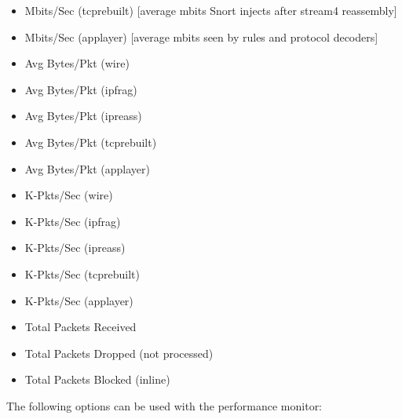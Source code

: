 \documentclass[english]{report}
\begin{document}
\begin{itemize}
\item Mbits/Sec (tcprebuilt) [average mbits Snort injects after stream4 reassembly]
\item Mbits/Sec (applayer) [average mbits seen by rules and protocol decoders]
\item Avg Bytes/Pkt (wire)
\item Avg Bytes/Pkt (ipfrag)
\item Avg Bytes/Pkt (ipreass)
\item Avg Bytes/Pkt (tcprebuilt)
\item Avg Bytes/Pkt (applayer)
\item K-Pkts/Sec (wire)
\item K-Pkts/Sec (ipfrag)
\item K-Pkts/Sec (ipreass)
\item K-Pkts/Sec (tcprebuilt)
\item K-Pkts/Sec (applayer)
\item Total Packets Received
\item Total Packets Dropped (not processed)
\item Total Packets Blocked (inline)
\end{itemize}

The following options can be used with the performance monitor:
\end{document}
